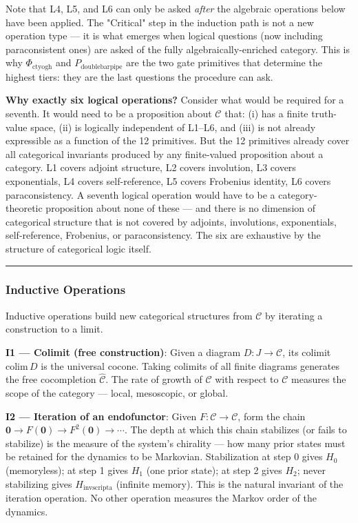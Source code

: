 \documentclass[12pt,a4paper]{article}
\begin{document}
Note that L4, L5, and L6 can only be asked \emph{after} the algebraic operations below have been applied. The "Critical" step in the induction path is not a new operation type --- it is what emerges when logical questions (now including paraconsistent ones) are asked of the fully algebraically-enriched category. This is why $\Phi_{\text{ctyogh}}$ and $P_{\text{doublebarpipe}}$ are the two gate primitives that determine the highest tiers: they are the last questions the procedure can ask.

\textbf{Why exactly six logical operations?} Consider what would be required for a seventh. It would need to be a proposition about $\mathcal{C}$ that: (i) has a finite truth-value space, (ii) is logically independent of L1--L6, and (iii) is not already expressible as a function of the 12 primitives. But the 12 primitives already cover all categorical invariants produced by any finite-valued proposition about a category. L1 covers adjoint structure, L2 covers involution, L3 covers exponentials, L4 covers self-reference, L5 covers Frobenius identity, L6 covers paraconsistency. A seventh logical operation would have to be a category-theoretic proposition about none of these --- and there is no dimension of categorical structure that is not covered by adjoints, involutions, exponentials, self-reference, Frobenius, or paraconsistency. The six are exhaustive by the structure of categorical logic itself.

\begin{center}
\rule{0.5\textwidth}{0.4pt}
\end{center}

\subsubsection{Inductive Operations}

Inductive operations build new categorical structures from $\mathcal{C}$ by iterating a construction to a limit.

\textbf{I1 --- Colimit (free construction)}: Given a diagram $D: J \to \mathcal{C}$, its colimit $\text{colim}\, D$ is the universal cocone. Taking colimits of all finite diagrams generates the free cocompletion $\hat{\mathcal{C}}$. The rate of growth of $\hat{\mathcal{C}}$ with respect to $\mathcal{C}$ measures the scope of the category --- local, mesoscopic, or global.

\textbf{I2 --- Iteration of an endofunctor}: Given $F: \mathcal{C} \to \mathcal{C}$, form the chain $\mathbf{0} \to F(\mathbf{0}) \to F^2(\mathbf{0}) \to \cdots$. The depth at which this chain stabilizes (or fails to stabilize) is the measure of the system's chirality --- how many prior states must be retained for the dynamics to be Markovian. Stabilization at step 0 gives $H_0$ (memoryless); at step 1 gives $H_1$ (one prior state); at step 2 gives $H_2$; never stabilizing gives $H_{\text{invscripta}}$ (infinite memory). This is the natural invariant of the iteration operation. No other operation measures the Markov order of the dynamics.
\end{document}
